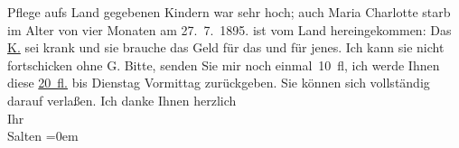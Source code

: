 \begin{ledgroupsized}[t]{13cm}
{{{                  Pflege aufs Land gegebenen Kindern war sehr hoch; auch Maria Charlotte starb im Alter von vier Monaten am 27. 7. 1895.}}}\label{K_L03156-1h} ist vom Land hereingekommen: Das
                  \uline{K.} sei krank und sie brauche das Geld für das und für jenes. Ich kann sie nicht
               fortschicken ohne G. Bitte, senden Sie mir noch einmal 10 fl, ich {\pb}werde Ihnen diese \uline{20 fl.} bis Dienstag{ }Vormittag{ } zurückgeben. Sie können sich vollständig
               darauf verlaßen. Ich danke Ihnen \pend
           \pstart
           herzlich {\\[\baselineskip]}Ihr {\\[\baselineskip]}\spacefill\mbox{Salten}\pend
           \leftskip=0em{}
         
         \endnumbering{}\end{ledgroupsized}  \newcommand{\dateiname}{L03156}\newcommand{\titel}{Felix Salten an Arthur Schnitzler, [9. 6. 1895]}\newcommand{\editorInnen}{Martin Anton Müller und Laura Untner}
      